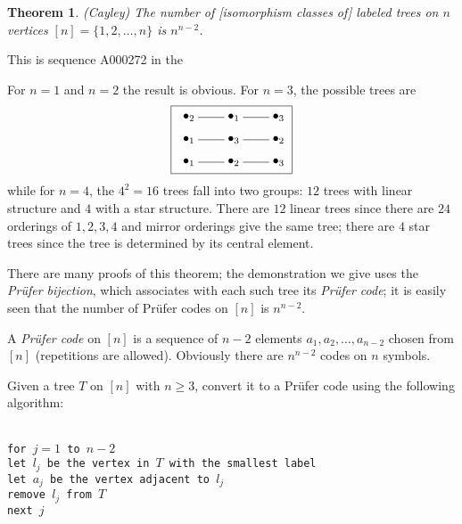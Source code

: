 \documentclass[12pt]{article}
\newtheorem{thm}{Theorem}
\begin{document}
\begin{thm} (Cayley) The number of [isomorphism classes of] labeled trees on $n$ vertices $[n]=\{1,2,\ldots,n\}$ is $n^{n-2}$.
\end{thm}

This is sequence A000272 in the 

For $n=1$ and $n=2$ the result is obvious. For $n=3$, the possible trees are
\[ \fbox{ \xygraph{
!{(0,0) }*+{\bullet_{1}}="1"
!{(1,0) }*+{\bullet_{2}}="2"
!{(2,0) }*+{\bullet_{3}}="3"
!{(0,.5) }*+{\bullet_{1}}="4"
!{(1,.5) }*+{\bullet_{3}}="5"
!{(2,.5) }*+{\bullet_{2}}="6"
!{(0,1) }*+{\bullet_{2}}="7"
!{(1,1) }*+{\bullet_{1}}="8"
!{(2,1) }*+{\bullet_{3}}="9"
"1"-"2" "2"-"3"
"4"-"5" "5"-"6"
"7"-"8" "8"-"9"
} } \]
while for $n=4$, the $4^2=16$ trees fall into two groups: $12$ trees with linear structure and $4$ with a star structure. There are $12$ linear trees since there are $24$ orderings of $1,2,3,4$ and mirror orderings give the same tree; there are $4$ star trees since the tree is determined by its central element.

There are many proofs of this theorem; the demonstration we give uses the \emph{Pr\"ufer bijection}, which associates with each such tree its \emph{Pr\"ufer code}; it is easily seen that the number of Pr\"ufer codes on $[n]$ is $n^{n-2}$.

A \emph{Pr\"ufer code} on $[n]$ is a sequence of $n-2$ elements $a_1,a_2,\ldots,a_{n-2}$ chosen from $[n]$ (repetitions are allowed). Obviously there are $n^{n-2}$ codes on $n$ symbols.

Given a tree $T$ on $[n]$ with $n\geq 3$, convert it to a Pr\"ufer code using the following algorithm:

\texttt{
\\
\hspace*{6pt}for $j=1$ to $n-2$\\
\hspace*{18pt}let $l_j$ be the vertex in $T$ with the smallest label\\
\hspace*{18pt}let $a_j$ be the vertex adjacent to $l_j$\\
\hspace*{18pt}remove $l_j$ from $T$\\
\hspace*{6pt}next $j$
}
\end{document}
